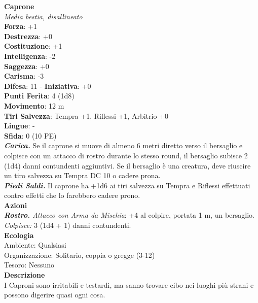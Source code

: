 \begin{multicols}{2}
\medskip\textbf{Caprone}\\
\emph{Media bestia, disallineato}\\
\textbf{Forza}: +1\\
\textbf{Destrezza}: +0\\
\textbf{Costituzione}: +1\\
\textbf{Intelligenza}: -2\\
\textbf{Saggezza}: +0\\
\textbf{Carisma}: -3\\
\textbf{Difesa}: 11 - \textbf{Iniziativa}: +0\\
\textbf{Punti Ferita}: 4 (1d8)\\
\textbf{Movimento}: 12 m\\
\textbf{Tiri Salvezza}: Tempra +1, Riflessi +1, Arbitrio +0 \\
\textbf{Lingue}: -\\
\textbf{Sfida}: 0 (10 PE)\smallskip\\
\emph{\textbf{Carica.}} Se il caprone si muove di almeno 6 metri diretto verso il bersaglio e colpisce con un attacco di rostro durante lo stesso round, il bersaglio subisce 2 (1d4) danni contundenti aggiuntivi. Se il bersaglio è una creatura, deve riuscire un tiro salvezza su Tempra DC 10 o cadere prona.\\
\emph{\textbf{Piedi Saldi.}} Il caprone ha +1d6 ai tiri salvezza su Tempra e Riflessi effettuati contro effetti che lo farebbero cadere prono.  \\
\smallskip\textbf{Azioni}\\
\emph{\textbf{Rostro.} Attacco con Arma da Mischia}: +4 al colpire, portata 1 m, un bersaglio.\\
\emph{Colpisce:} 3 (1d4 + 1) danni contundenti.\\
\textbf{Ecologia}\\
Ambiente: Qualsiasi\\
Organizzazione: Solitario, coppia o gregge (3-12)\\
Tesoro: Nessuno\\
\textbf{Descrizione}\\
I Caproni sono irritabili e testardi, ma sanno trovare cibo nei luoghi più strani e possono digerire quasi ogni cosa. \\


\end{multicols}
